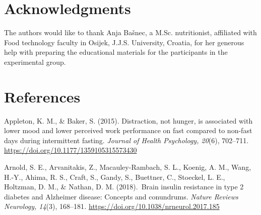 \documentclass[authordate, empirical,issue]{jote-new-article}
\begin{document}
\section{Acknowledgments}



The authors would like to thank Anja Bašnec, a M.Sc. nutritionist, affiliated with Food technology faculty in Osijek, J.J.S. University, Croatia, for her generous help with preparing the educational materials for the participants in the experimental group.






\section{References }









Appleton, K. M., \& Baker, S. (2015). Distraction, not hunger, is associated with lower mood and lower perceived work performance on fast compared to non-fast days during intermittent fasting.\emph{ Journal of Health Psychology, 20}(6), 702--711. \url{https://doi.org/10.1177/1359105315573430}



Arnold, S. E., Arvanitakis, Z., Macauley-Rambach, S. L., Koenig, A. M., Wang, H.-Y., Ahima, R. S., Craft, S., Gandy, S., Buettner, C., Stoeckel, L. E., Holtzman, D. M., \& Nathan, D. M. (2018). Brain insulin resistance in type 2 diabetes and Alzheimer disease: Concepts and conundrums.\emph{ Nature Reviews Neurology, 14}(3), 168--181\emph{.} \url{https://doi.org/10.1038/nrneurol.2017.185}



\end{document}
